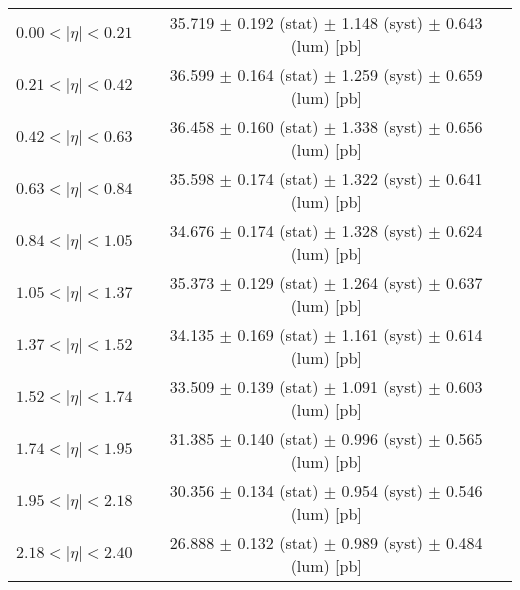 \begin{tabular}{lc}
\hline
$0.00 < |\eta| <0.21$          & 35.719 $\pm$ 0.192 (stat) $\pm$ 1.148 (syst) $\pm$ 0.643 (lum) [pb]  \\
$0.21 < |\eta| <0.42$          & 36.599 $\pm$ 0.164 (stat) $\pm$ 1.259 (syst) $\pm$ 0.659 (lum) [pb]  \\
$0.42 < |\eta| <0.63$          & 36.458 $\pm$ 0.160 (stat) $\pm$ 1.338 (syst) $\pm$ 0.656 (lum) [pb]  \\
$0.63 < |\eta| <0.84$          & 35.598 $\pm$ 0.174 (stat) $\pm$ 1.322 (syst) $\pm$ 0.641 (lum) [pb]  \\
$0.84 < |\eta| <1.05$          & 34.676 $\pm$ 0.174 (stat) $\pm$ 1.328 (syst) $\pm$ 0.624 (lum) [pb]  \\
$1.05 < |\eta| <1.37$          & 35.373 $\pm$ 0.129 (stat) $\pm$ 1.264 (syst) $\pm$ 0.637 (lum) [pb]  \\
$1.37 < |\eta| <1.52$          & 34.135 $\pm$ 0.169 (stat) $\pm$ 1.161 (syst) $\pm$ 0.614 (lum) [pb]  \\
$1.52 < |\eta| <1.74$          & 33.509 $\pm$ 0.139 (stat) $\pm$ 1.091 (syst) $\pm$ 0.603 (lum) [pb]  \\
$1.74 < |\eta| <1.95$          & 31.385 $\pm$ 0.140 (stat) $\pm$ 0.996 (syst) $\pm$ 0.565 (lum) [pb]  \\
$1.95 < |\eta| <2.18$          & 30.356 $\pm$ 0.134 (stat) $\pm$ 0.954 (syst) $\pm$ 0.546 (lum) [pb]  \\
$2.18 < |\eta| <2.40$          & 26.888 $\pm$ 0.132 (stat) $\pm$ 0.989 (syst) $\pm$ 0.484 (lum) [pb]  \\
\hline
\end{tabular}

